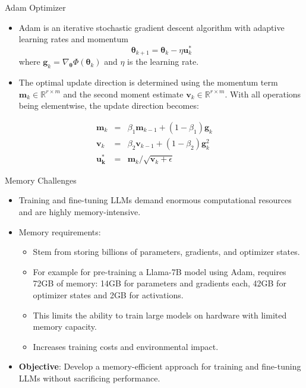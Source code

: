 \documentclass{beamer}
\begin{document}
\begin{frame}{Adam Optimizer}
    \begin{itemize}
        \item Adam \citep{kingmaAdamMethodStochastic2014} is an iterative stochastic gradient descent algorithm with adaptive learning rates and momentum
        \[
            \mathbf{\theta}_{k+1} = \mathbf{\theta}_{k} - \eta \mathbf{u}_{k}^{*}
        \]
        where \(\mathbf{g}_{k} = \nabla_{\mathbf{\theta}} \Phi(\mathbf{\theta}_{k})\) and \(\eta\) is the learning rate.
        \vspace{0.5em}
        \item The optimal update direction is determined using the momentum term \(\mathbf{m}_{k} \in \mathbb{R}^{r\times m}\) and the second moment estimate \(\mathbf{v}_{k} \in \mathbb{R}^{r\times m}\). With all operations being elementwise, the update direction becomes:
    \end{itemize}
    \begin{eqnarray}
        \mathbf{m}_{k} &=& \beta_{1} \mathbf{m}_{k-1} + (1-\beta_{1}) \mathbf{g}_{k} \\
        \mathbf{v}_{k} &=& \beta_{2} \mathbf{v}_{k-1} + (1-\beta_2) \mathbf{g}^{2}_{k}  \\
        \mathbf{u_{k}^{*}} &=& \mathbf{m}_{k} / \sqrt{\mathbf{v}_{k} + \epsilon}
        \label{eq:adam_update}
    \end{eqnarray}
\end{frame}

\begin{frame}{Memory Challenges}
    \begin{itemize}
        \item Training and fine-tuning LLMs demand enormous computational resources and are highly memory-intensive.
        \item Memory requirements: 
        \begin{itemize}
            \item Stem from storing billions of parameters, gradients, and optimizer states.
            \vspace{0.5em}
            \item For example for pre-training a Llama-7B model using Adam, requires 72GB of memory: 14GB for parameters and gradients each, 42GB for optimizer states and 2GB for activations.
            \vspace{0.5em}
            \item This limits the ability to train large models on hardware with limited memory capacity.
            \vspace{0.5em}
            \item Increases training costs and environmental impact.
        \end{itemize}
        \item \textbf{Objective}: Develop a memory-efficient approach for training and fine-tuning LLMs without sacrificing performance.
    \end{itemize}
\end{frame}
\end{document}
